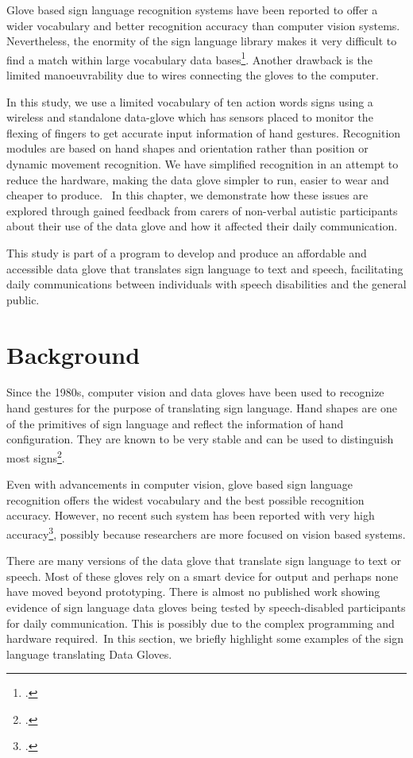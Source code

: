 Glove based sign language recognition systems have been reported to offer a wider vocabulary and better recognition accuracy than computer vision systems. Nevertheless, the enormity of the sign language library makes it very difficult to find a match within large vocabulary data bases\footcite{Premaratne2010}. Another drawback is the limited manoeuvrability due to wires connecting the gloves to the computer. 

In this study, we use a limited vocabulary of ten action words signs using a wireless and standalone data-glove which has sensors placed to monitor the flexing of fingers to get accurate input information of hand gestures. Recognition modules are based on hand shapes and orientation rather than position or dynamic movement recognition. We have simplified recognition in an attempt to reduce the hardware, making the data glove simpler to run, easier to wear and cheaper to produce. 
In this chapter, we demonstrate how these issues are explored through gained feedback from carers of non-verbal autistic participants about their use of the data glove and how it affected their daily communication. 

This study is part of a program to develop and produce an affordable and accessible data glove that translates sign language to text and speech, facilitating daily communications between individuals with speech disabilities and the general public. 

\section{Background}

Since the 1980s, computer vision and data gloves have been used to recognize hand gestures for the purpose of translating sign language. Hand shapes are one of the primitives of sign language and reflect the information of hand configuration. They are known to be very stable and can be used to distinguish most signs\footcite{Fang2003}. 

Even with advancements in computer vision, glove based sign language recognition offers the widest vocabulary and the best possible recognition accuracy. However, no recent such system has been reported with very high accuracy\footcite{Premaratne2010}, possibly because researchers are more focused on vision based systems. 

There are many versions of the data glove that translate sign language to text or speech. Most of these gloves rely on a smart device for output and perhaps none have moved beyond prototyping. There is almost no published work showing evidence of sign language data gloves being tested by speech-disabled participants for daily communication. This is possibly due to the complex programming and hardware required. In this section, we briefly highlight some examples of the sign language translating Data Gloves.

